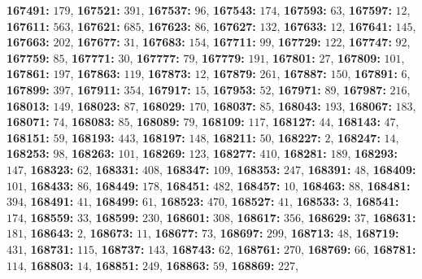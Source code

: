 \textsf{\bfseries 167491:} $179$, \textsf{\bfseries 167521:} $391$, \textsf{\bfseries 167537:} $96$, \textsf{\bfseries 167543:} $174$, \textsf{\bfseries 167593:} $63$, \textsf{\bfseries 167597:} $12$, \textsf{\bfseries 167611:} $563$, \textsf{\bfseries 167621:} $685$, \textsf{\bfseries 167623:} $86$, \textsf{\bfseries 167627:} $132$, \textsf{\bfseries 167633:} $12$, \textsf{\bfseries 167641:} $145$, \textsf{\bfseries 167663:} $202$, \textsf{\bfseries 167677:} $31$, \textsf{\bfseries 167683:} $154$, \textsf{\bfseries 167711:} $99$, \textsf{\bfseries 167729:} $122$, \textsf{\bfseries 167747:} $92$, \textsf{\bfseries 167759:} $85$, \textsf{\bfseries 167771:} $30$, \textsf{\bfseries 167777:} $79$, \textsf{\bfseries 167779:} $191$, \textsf{\bfseries 167801:} $27$, \textsf{\bfseries 167809:} $101$, \textsf{\bfseries 167861:} $197$, \textsf{\bfseries 167863:} $119$, \textsf{\bfseries 167873:} $12$, \textsf{\bfseries 167879:} $261$, \textsf{\bfseries 167887:} $150$, \textsf{\bfseries 167891:} $6$, \textsf{\bfseries 167899:} $397$, \textsf{\bfseries 167911:} $354$, \textsf{\bfseries 167917:} $15$, \textsf{\bfseries 167953:} $52$, \textsf{\bfseries 167971:} $89$, \textsf{\bfseries 167987:} $216$, \textsf{\bfseries 168013:} $149$, \textsf{\bfseries 168023:} $87$, \textsf{\bfseries 168029:} $170$, \textsf{\bfseries 168037:} $85$, \textsf{\bfseries 168043:} $193$, \textsf{\bfseries 168067:} $183$, \textsf{\bfseries 168071:} $74$, \textsf{\bfseries 168083:} $85$, \textsf{\bfseries 168089:} $79$, \textsf{\bfseries 168109:} $117$, \textsf{\bfseries 168127:} $44$, \textsf{\bfseries 168143:} $47$, \textsf{\bfseries 168151:} $59$, \textsf{\bfseries 168193:} $443$, \textsf{\bfseries 168197:} $148$, \textsf{\bfseries 168211:} $50$, \textsf{\bfseries 168227:} $2$, \textsf{\bfseries 168247:} $14$, \textsf{\bfseries 168253:} $98$, \textsf{\bfseries 168263:} $101$, \textsf{\bfseries 168269:} $123$, \textsf{\bfseries 168277:} $410$, \textsf{\bfseries 168281:} $189$, \textsf{\bfseries 168293:} $147$, \textsf{\bfseries 168323:} $62$, \textsf{\bfseries 168331:} $408$, \textsf{\bfseries 168347:} $109$, \textsf{\bfseries 168353:} $247$, \textsf{\bfseries 168391:} $48$, \textsf{\bfseries 168409:} $101$, \textsf{\bfseries 168433:} $86$, \textsf{\bfseries 168449:} $178$, \textsf{\bfseries 168451:} $482$, \textsf{\bfseries 168457:} $10$, \textsf{\bfseries 168463:} $88$, \textsf{\bfseries 168481:} $394$, \textsf{\bfseries 168491:} $41$, \textsf{\bfseries 168499:} $61$, \textsf{\bfseries 168523:} $470$, \textsf{\bfseries 168527:} $41$, \textsf{\bfseries 168533:} $3$, \textsf{\bfseries 168541:} $174$, \textsf{\bfseries 168559:} $33$, \textsf{\bfseries 168599:} $230$, \textsf{\bfseries 168601:} $308$, \textsf{\bfseries 168617:} $356$, \textsf{\bfseries 168629:} $37$, \textsf{\bfseries 168631:} $181$, \textsf{\bfseries 168643:} $2$, \textsf{\bfseries 168673:} $11$, \textsf{\bfseries 168677:} $73$, \textsf{\bfseries 168697:} $299$, \textsf{\bfseries 168713:} $48$, \textsf{\bfseries 168719:} $431$, \textsf{\bfseries 168731:} $115$, \textsf{\bfseries 168737:} $143$, \textsf{\bfseries 168743:} $62$, \textsf{\bfseries 168761:} $270$, \textsf{\bfseries 168769:} $66$, \textsf{\bfseries 168781:} $114$, \textsf{\bfseries 168803:} $14$, \textsf{\bfseries 168851:} $249$, \textsf{\bfseries 168863:} $59$, \textsf{\bfseries 168869:} $227$, 
